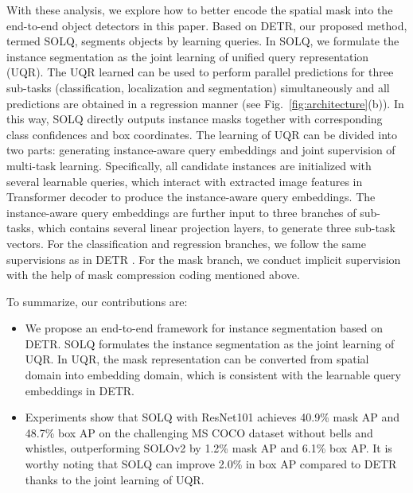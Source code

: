 \documentclass{article}
\begin{document}
With these analysis, we explore how to better encode the spatial mask into the end-to-end object detectors in this paper. Based on DETR, our proposed method, termed SOLQ, segments objects by learning queries. In SOLQ, we formulate the instance segmentation as the joint learning of unified query representation (UQR). The UQR learned can be used to perform parallel predictions for three sub-tasks (classification, localization and segmentation) simultaneously and all predictions are obtained in a regression manner (see Fig.~\ref{fig:architecture}(b)). In this way, SOLQ directly outputs instance masks together with corresponding class confidences and box coordinates. The learning of UQR can be divided into two parts: generating instance-aware query embeddings and joint supervision of multi-task learning. Specifically, all candidate instances are initialized with several learnable queries, which interact with extracted image features in Transformer decoder to produce the instance-aware query embeddings. The instance-aware query embeddings are further input to three branches of sub-tasks, which contains several linear projection layers, to generate three sub-task vectors. For the classification and regression branches, we follow the same supervisions as in DETR \cite{carion2020detr}. For the mask branch, we conduct implicit supervision with the help of mask compression coding mentioned above. 

To summarize, our contributions are:
\begin{itemize}
\item We propose an end-to-end framework for instance segmentation based on DETR. SOLQ formulates the instance segmentation as the joint learning of UQR. In UQR, the mask representation can be converted from spatial domain into embedding domain, which is consistent with the learnable query embeddings in DETR. 
\item Experiments show that SOLQ with ResNet101 achieves 40.9\% mask AP and 48.7\% box AP on the challenging MS COCO dataset \cite{lin2014microsoft} without bells and whistles, outperforming SOLOv2 by 1.2\% mask AP and 6.1\% box AP. It is worthy noting that SOLQ can improve 2.0\% in box AP compared to DETR thanks to the joint learning of UQR.
\end{itemize}
\end{document}
